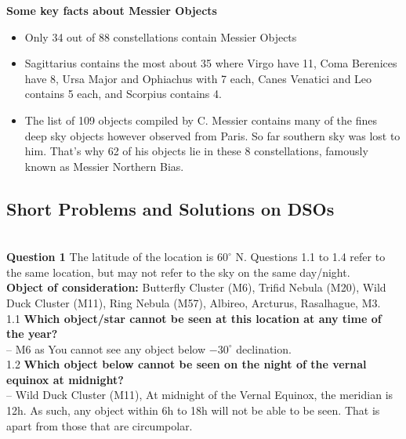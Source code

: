 \documentclass[a4paper,12pt]{extarticle}
\begin{document}
\textbf{Some key facts about Messier Objects}
\begin{itemize}
    \item Only 34 out of 88 constellations contain Messier Objects
    \item Sagittarius contains the most about 35 where Virgo have 11, Coma Berenices have 8, Ursa Major and Ophiachus with 7 each, Canes Venatici and Leo contains 5 each, and Scorpius contains 4.
    \item The list of 109 objects compiled by C. Messier contains many of the fines deep sky objects however observed from Paris. So far southern sky was lost to him. That's why 62 of his objects lie in these 8 constellations, famously known as Messier Northern Bias. 
\end{itemize}

\clearpage 
\subsection{Short Problems and Solutions on DSOs}

\\


\textsf{\textbf{Question 1}} The latitude of the location is $60^\circ$ N. Questions 1.1 to 1.4 refer to the same location, but may not refer to the sky on the same day/night. \\

\textbf{Object of consideration:} Butterfly Cluster (M6), Trifid Nebula (M20), Wild Duck Cluster (M11), Ring Nebula (M57), Albireo, Arcturus, Rasalhague, M3.\\

1.1 \textbf{Which object/star cannot be seen at this location at any time of the year?}\\
    -- M6 as You cannot see any object below $-30^\circ$ declination.\\
    
1.2  \textbf{Which object below cannot be seen on the night of the vernal equinox at midnight?}\\
    -- Wild Duck Cluster (M11), At midnight of the Vernal Equinox, the meridian is 12h. As such, any object within 6h to 18h will not be able to be seen. That is apart from those that are circumpolar.\\
    
\end{document}
